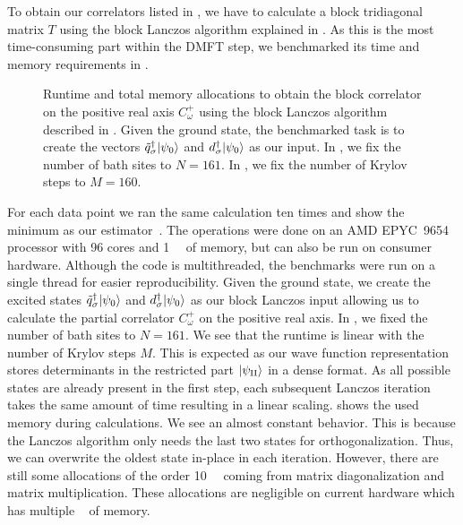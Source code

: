 To obtain our correlators listed in ,
we have to calculate a block tridiagonal matrix $T$
using the block Lanczos algorithm explained in .
As this is the most time-consuming part within the DMFT step,
we benchmarked its time and memory requirements in .
\begin{figure}[ht]
    \centering
    
    \caption{
        Runtime and total memory allocations
        to obtain the block correlator on the positive real axis $C^+_\omega$ using
        the block Lanczos algorithm described in .
        Given the ground state, the benchmarked task is to create the vectors
        $\tilde q^\dag_\sigma\lvert\psi_0\rangle$
        and
        $d^\dag_\sigma\lvert\psi_0\rangle$ as our input.
        In ,
        we fix the number of bath sites to $N=161$.
        In ,
        we fix the number of Krylov steps to $M=160$.
    }%
    \label{fig:performance}
\end{figure}
For each data point we ran the same calculation ten times and show the minimum
as our estimator~\cite{Chen2016}.
The operations were done on an AMD EPYC\texttrademark~9654 processor
with 96 cores and \qty{1}{\tera\byte} of memory,
but can also be run on consumer hardware.
Although the code is multithreaded,
the benchmarks were run on a single thread for easier reproducibility.
Given the ground state, we create the excited states
$\tilde q^\dag_\sigma\lvert\psi_0\rangle$
and
$d^\dag_\sigma\lvert\psi_0\rangle$ as our block Lanczos input allowing us to calculate
the partial correlator $C^+_\omega$ on the positive real axis.
In ,
we fixed the number of bath sites to $N=161$.
We see that the runtime is linear with the number of Krylov steps $M$.
This is expected as our wave function representation stores determinants
in the restricted part $\lvert\psi_{\mathrm{II}}\rangle$ in a dense format.
As all possible states are already present in the first step,
each subsequent Lanczos iteration takes the same amount of time
resulting in a linear scaling.
 shows the used memory during calculations.
We see an almost constant behavior.
This is because the Lanczos algorithm only needs the last two states for
orthogonalization.
Thus, we can overwrite the oldest state in-place in each iteration.
However, there are still some allocations of the order \qty{10}{\mega\byte}
coming from matrix diagonalization and matrix multiplication.
These allocations are negligible on current hardware
which has multiple \unit{\giga\byte} of memory.

